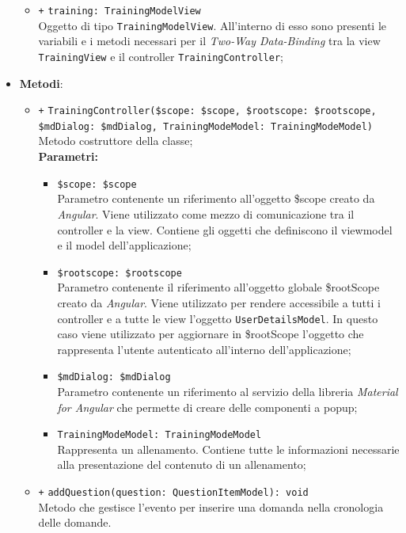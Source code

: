 \begin{itemize}
\begin{itemize}
		\item \texttt{+} \texttt{training: TrainingModelView} \\
		Oggetto di tipo \texttt{TrainingModelView}. All'interno di esso sono presenti le variabili e i metodi necessari per il \textit{Two-Way Data-Binding} tra la view \texttt{TrainingView} e il controller \texttt{TrainingController};
	\end{itemize}
	\item \textbf{Metodi}:
	\begin{itemize}
		\item \texttt{+} \texttt{TrainingController(\$scope: \$scope, \$rootscope: \$rootscope, \$mdDialog: \$mdDialog, TrainingModeModel: TrainingModeModel)} \\ Metodo costruttore della classe; \\
		\textbf{Parametri:}
		\begin{itemize}
			\item \texttt{\$scope: \$scope} \\
			Parametro contenente un riferimento all’oggetto \$scope creato da \textit{Angular}. Viene utilizzato come mezzo di comunicazione tra il controller e la view. Contiene gli oggetti che definiscono il viewmodel e il model dell’applicazione;
			\item \texttt{\$rootscope: \$rootscope}\\
			Parametro contenente il riferimento all'oggetto globale \$rootScope creato da \textit{Angular}. Viene utilizzato per rendere accessibile a tutti i controller e a tutte le view l'oggetto \texttt{UserDetailsModel}. In questo caso viene utilizzato per aggiornare in \$rootScope l'oggetto che rappresenta l'utente autenticato all'interno dell'applicazione;
			\item \texttt{\$mdDialog: \$mdDialog} \\
			Parametro contenente un riferimento al servizio della libreria \textit{Material for Angular} che permette di creare delle componenti a popup;
			\item \texttt{TrainingModeModel: TrainingModeModel} \\ Rappresenta un allenamento. Contiene tutte le informazioni necessarie alla presentazione del contenuto di un allenamento;
		\end{itemize}
		\item \texttt{+} \texttt{addQuestion(question: QuestionItemModel): void} \\
		Metodo che gestisce l'evento per inserire una domanda nella cronologia delle domande. \\

\end{itemize}
\end{itemize}
